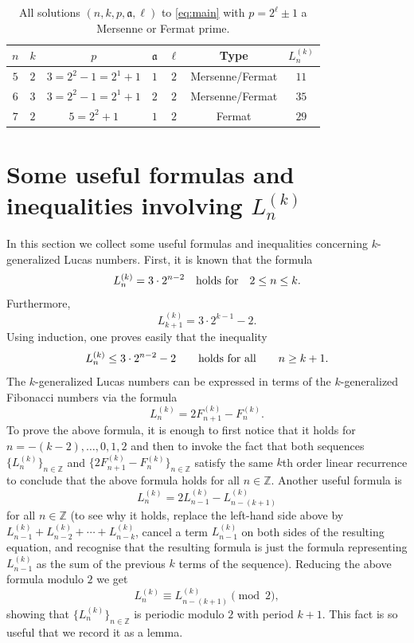 \documentclass[11pt,a4paper]{article}
\numberwithin{equation}{section}
\numberwithin{table}{section}
\numberwithin{figure}{section}
\begin{document}
\begin{table}[H]
	\centering
	\renewcommand{\arraystretch}{1.3}
	\begin{tabular}{ccccccc}
		\hline
		$n$ & $k$ & $p$ & $\mathfrak{a}$ & $\ell$ & Type & $L_n^{(k)}$ \\
		\hline
		$5$ & $2$ & $3=2^2-1=2^1+1$ & $1$ & $2$ & Mersenne/Fermat & $11$ \\
		$6$ & $3$ & $3=2^2-1=2^1+1$ & $2$ & $2$ & Mersenne/Fermat & $35$ \\
		$7$ & $2$ & $5=2^2+1$        & $1$ & $2$ & Fermat          & $29$ \\
		\hline
	\end{tabular}
	\caption{All solutions $(n,k,p,\mathfrak{a},\ell)$ to \eqref{eq:main}
		with $p=2^{\ell}\pm 1$ a Mersenne or Fermat prime.}
	\label{tab:solutions}
\end{table}
\section{Some useful formulas and inequalities involving $L_n^{(k)}$}

In this section we collect some useful formulas and inequalities concerning $k$-generalized Lucas numbers. First, it is known that the formula
\begin{align*}
	L_n^{(k)} = 3 \cdot 2^{n-2}\quad {\text{\rm holds~for}}\quad 2\le n\le k.
\end{align*}
Furthermore, 
\[
L_{k+1}^{(k)} = 3 \cdot 2^{k-1} - 2.
\]
Using induction, one proves easily that the inequality
\begin{equation}
\label{eq:3times2}
	L_n^{(k)} \le 3 \cdot 2^{n-2}-2\qquad {\text{\rm holds~for~all}}\qquad n\ge k+1.
\end{equation}
The $k$-generalized Lucas numbers can be expressed in terms of the $k$-generalized Fibonacci numbers via the formula
\begin{equation}
\label{eq:FL}
L_n^{(k)}=2F_{n+1}^{(k)}-F_n^{(k)}.
\end{equation}
To prove the above formula, it is enough to first notice that it holds for $n=-(k-2),\ldots,0,1,2$ and then to invoke the fact that both sequences $\{L_n^{(k)}\}_{n\in {\mathbb Z}}$ and $\{2F_{n+1}^{(k)}-F_n^{(k)}\}_{n\in {\mathbb Z}}$ 
satisfy the same $k$th order linear recurrence to conclude that the above formula holds for all $n\in {\mathbb Z}$. Another useful formula is 
$$
L_{n}^{(k)}=2L_{n-1}^{(k)}-L_{n-(k+1)}^{(k)}
$$
for all $n\in {\mathbb Z}$ (to see why it holds, replace the left-hand side above by $L_{n-1}^{(k)}+L_{n-2}^{(k)}+\cdots+L_{n-k}^{(k)}$, cancel a term $L_{n-1}^{(k)}$ on both sides of the resulting equation, and recognise that 
the resulting formula is just the formula representing $L_{n-1}^{(k)}$ as the sum of the previous $k$ terms of the sequence).  Reducing the above formula modulo $2$ we get
$$
L_n^{(k)}\equiv L_{n-(k+1)}^{(k)} \pmod 2,
$$
showing that $\{L_n^{(k)}\}_{n\in {\mathbb Z}}$ is periodic modulo $2$ with period $k+1$. This fact is so useful that we record it as a lemma.
\end{document}
